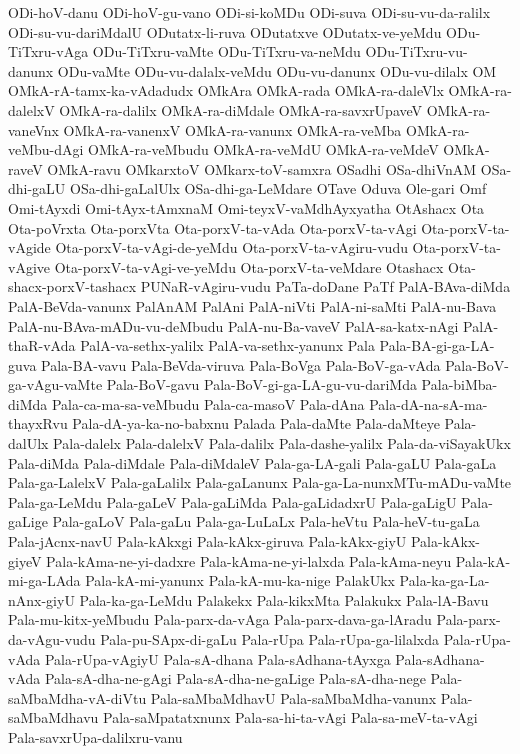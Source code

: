 {ODi-hoV-danu
ODi-hoV-gu-vano
ODi-si-koMDu
ODi-suva
ODi-su-vu-da-ralilx
ODi-su-vu-dariMdalU
ODutatx-li-ruva
ODutatxve
ODutatx-ve-yeMdu
ODu-TiTxru-vAga
ODu-TiTxru-vaMte
ODu-TiTxru-va-neMdu
ODu-TiTxru-vu-danunx
ODu-vaMte
ODu-vu-dalalx-veMdu
ODu-vu-danunx
ODu-vu-dilalx
OM
OMkA-rA-tamx-ka-vAdadudx
OMkAra
OMkA-rada
OMkA-ra-daleVlx
OMkA-ra-dalelxV
OMkA-ra-dalilx
OMkA-ra-diMdale
OMkA-ra-savxrUpaveV
OMkA-ra-vaneVnx
OMkA-ra-vanenxV
OMkA-ra-vanunx
OMkA-ra-veMba
OMkA-ra-veMbu-dAgi
OMkA-ra-veMbudu
OMkA-ra-veMdU
OMkA-ra-veMdeV
OMkA-raveV
OMkA-ravu
OMkarxtoV
OMkarx-toV-samxra
OSadhi
OSa-dhiVnAM
OSa-dhi-gaLU
OSa-dhi-gaLalUlx
OSa-dhi-ga-LeMdare
OTave
Oduva
Ole-gari
Omf
Omi-tAyxdi
Omi-tAyx-tAmxnaM
Omi-teyxV-vaMdhAyxyatha
OtAshacx
Ota
Ota-poVrxta
Ota-porxVta
Ota-porxV-ta-vAda
Ota-porxV-ta-vAgi
Ota-porxV-ta-vAgide
Ota-porxV-ta-vAgi-de-yeMdu
Ota-porxV-ta-vAgiru-vudu
Ota-porxV-ta-vAgive
Ota-porxV-ta-vAgi-ve-yeMdu
Ota-porxV-ta-veMdare
Otashacx
Ota-shacx-porxV-tashacx
PUNaR-vAgiru-vudu
PaTa-doDane
PaTf
PalA-BAva-diMda
PalA-BeVda-vanunx
PalAnAM
PalAni
PalA-niVti
PalA-ni-saMti
PalA-nu-Bava
PalA-nu-BAva-mADu-vu-deMbudu
PalA-nu-Ba-vaveV
PalA-sa-katx-nAgi
PalA-thaR-vAda
PalA-va-sethx-yalilx
PalA-va-sethx-yanunx
Pala
Pala-BA-gi-ga-LA-guva
Pala-BA-vavu
Pala-BeVda-viruva
Pala-BoVga
Pala-BoV-ga-vAda
Pala-BoV-ga-vAgu-vaMte
Pala-BoV-gavu
Pala-BoV-gi-ga-LA-gu-vu-dariMda
Pala-biMba-diMda
Pala-ca-ma-sa-veMbudu
Pala-ca-masoV
Pala-dAna
Pala-dA-na-sA-ma-thayxRvu
Pala-dA-ya-ka-no-babxnu
Palada
Pala-daMte
Pala-daMteye
Pala-dalUlx
Pala-dalelx
Pala-dalelxV
Pala-dalilx
Pala-dashe-yalilx
Pala-da-viSayakUkx
Pala-diMda
Pala-diMdale
Pala-diMdaleV
Pala-ga-LA-gali
Pala-gaLU
Pala-gaLa
Pala-ga-LalelxV
Pala-gaLalilx
Pala-gaLanunx
Pala-ga-La-nunxMTu-mADu-vaMte
Pala-ga-LeMdu
Pala-gaLeV
Pala-gaLiMda
Pala-gaLidadxrU
Pala-gaLigU
Pala-gaLige
Pala-gaLoV
Pala-gaLu
Pala-ga-LuLaLx
Pala-heVtu
Pala-heV-tu-gaLa
Pala-jAcnx-navU
Pala-kAkxgi
Pala-kAkx-giruva
Pala-kAkx-giyU
Pala-kAkx-giyeV
Pala-kAma-ne-yi-dadxre
Pala-kAma-ne-yi-lalxda
Pala-kAma-neyu
Pala-kA-mi-ga-LAda
Pala-kA-mi-yanunx
Pala-kA-mu-ka-nige
PalakUkx
Pala-ka-ga-La-nAnx-giyU
Pala-ka-ga-LeMdu
Palakekx
Pala-kikxMta
Palakukx
Pala-lA-Bavu
Pala-mu-kitx-yeMbudu
Pala-parx-da-vAga
Pala-parx-dava-ga-lAradu
Pala-parx-da-vAgu-vudu
Pala-pu-SApx-di-gaLu
Pala-rUpa
Pala-rUpa-ga-lilalxda
Pala-rUpa-vAda
Pala-rUpa-vAgiyU
Pala-sA-dhana
Pala-sAdhana-tAyxga
Pala-sAdhana-vAda
Pala-sA-dha-ne-gAgi
Pala-sA-dha-ne-gaLige
Pala-sA-dha-nege
Pala-saMbaMdha-vA-diVtu
Pala-saMbaMdhavU
Pala-saMbaMdha-vanunx
Pala-saMbaMdhavu
Pala-saMpatatxnunx
Pala-sa-hi-ta-vAgi
Pala-sa-meV-ta-vAgi
Pala-savxrUpa-dalilxru-vanu
}
